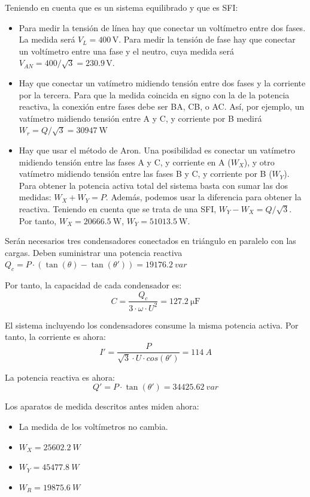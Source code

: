 Teniendo en cuenta que es un sistema equilibrado y que es SFI:
\begin{itemize}

\item Para medir la tensión de línea hay que conectar un voltímetro
  entre dos fases. La medida será $V_{L} = 400\,\mathrm{V}$. Para medir
  la tensión de fase hay que conectar un voltímetro entre una fase y
  el neutro, cuya medida será $V_{AN} = 400 / \sqrt{3} = 230.9\,\mathrm{V}$.

\item Hay que conectar un vatímetro midiendo tensión entre dos fases y
  la corriente por la tercera. Para que la medida coincida en signo
  con la de la potencia reactiva, la conexión entre fases debe ser BA,
  CB, o AC. Así, por ejemplo, un vatímetro midiendo tensión entre A y
  C, y corriente por B medirá $W_r = Q / \sqrt{3} = \qty{30947}{\watt}$

\item Hay que usar el método de Aron. Una posibilidad es conectar un
  vatímetro midiendo tensión entre las fases A y C, y corriente en A
  ($W_X$), y otro vatímetro midiendo tensión entre las fases B y C, y
  corriente por B ($W_Y$). Para obtener la potencia activa total del
  sistema basta con sumar las dos medidas: $W_{X} + W_{Y} =
  P$. Además, podemos usar la diferencia para obtener la
  reactiva. Teniendo en cuenta que se trata de una SFI,
  $W_Y - W_X = Q/\sqrt{3}$. Por tanto, $W_X = \SI{20666.5}{\watt}$,
  $W_Y = \SI{51013.5}{\watt}$.

\end{itemize}


Serán necesarios tres condensadores conectados en triángulo en
paralelo con las cargas. Deben suministrar una potencia reactiva
$Q_c = P \cdot (\tan(\theta) - \tan(\theta')) = \SI{19176.2}{var}$

\vspace{2mm}
Por tanto, la capacidad de cada condensador es:
\[
  C = \frac{Q_c}{3 \cdot \omega \cdot U^2} = \SI{127.2}{\micro\farad}
\]

El sistema incluyendo los condensadores consume la misma potencia
activa. Por tanto, la corriente es ahora:
\[I' = \frac{P}{\sqrt{3} \cdot U \cdot cos(\theta')} = \SI{114}{A}\]

La potencia reactiva es ahora:
\[
  Q' = P \cdot \tan(\theta') = \SI{34425.62}{var}
\]

Los aparatos de medida descritos antes miden ahora:
\begin{itemize}
\item La medida de los voltímetros no cambia.
\item $W_X = \SI{25602.2}{W}$
\item $W_Y = \SI{45477.8}{W}$
\item $W_R = \SI{19875.6}{W}$
\end{itemize}


